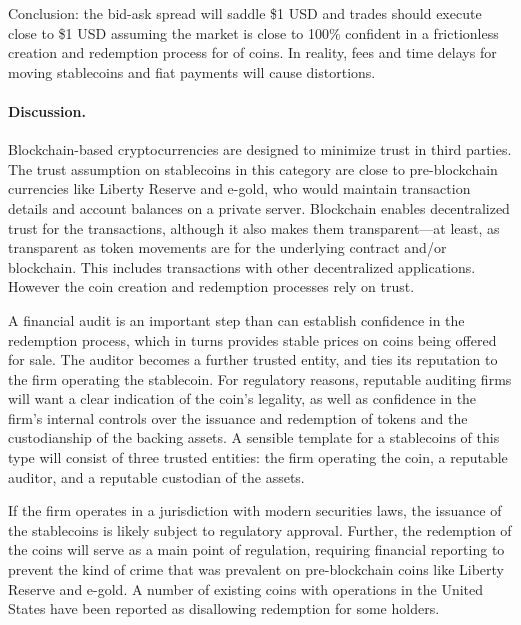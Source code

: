 Conclusion: the bid-ask spread will saddle \$1 USD and trades should execute close to \$1 USD assuming the market is close to 100\% confident in a frictionless creation and redemption process for of coins. In reality, fees and time delays for moving stablecoins and fiat payments will cause distortions.

\paragraph{Discussion.} Blockchain-based cryptocurrencies are designed to minimize trust in third parties. The trust assumption on stablecoins in this category are close to pre-blockchain currencies like Liberty Reserve and e-gold, who would maintain transaction details and account balances on a private server. Blockchain enables decentralized trust for the transactions, although it also makes them transparent---at least, as transparent as token movements are for the underlying contract and/or blockchain. This includes transactions with other decentralized applications. However the coin creation and redemption processes rely on trust.

A financial audit is an important step than can establish confidence in the redemption process, which in turns provides stable prices on coins being offered for sale. The auditor becomes a further trusted entity, and ties its reputation to the firm operating the stablecoin. For regulatory reasons, reputable auditing firms will want a clear indication of the coin's legality, as well as confidence in the firm's internal controls over the issuance and redemption of tokens and the custodianship of the backing assets. A sensible template for a stablecoins of this type will consist of three trusted entities: the firm operating the coin, a reputable auditor, and a reputable custodian of the assets.

If the firm operates in a jurisdiction with modern securities laws, the issuance of the stablecoins is likely subject to regulatory approval. Further, the redemption of the coins will serve as a main point of regulation, requiring financial reporting to prevent the kind of crime that was prevalent on pre-blockchain coins like Liberty Reserve and e-gold. A number of existing coins with operations in the United States have been reported as disallowing redemption for some holders.


